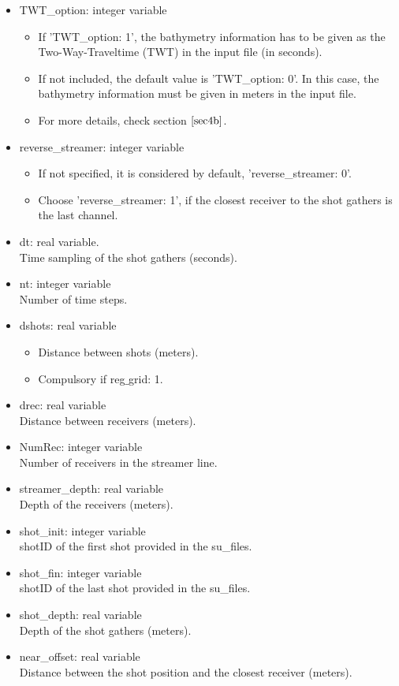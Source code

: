 \documentclass[11pt, oneside]{article}   	%
\begin{document}
\begin{itemize}
\begin{itemize}
	\end{itemize}
	
\item  TWT\_option: integer variable 
	\begin{itemize}
	\item If 'TWT\_option: 1', the bathymetry information has to be given as the Two-Way-Traveltime (TWT) in the input file (in seconds).
	\item If not included, the default value is 'TWT\_option: 0'. In this case, the bathymetry information must be given in meters in the input file.
	\item For more details, check section $\ref{sec4b}$.

	\end{itemize}
  
\item reverse\_streamer: integer variable 
	\begin{itemize}
	\item If not specified, it is considered by default, 'reverse\_streamer: 0'. 
	\item Choose 'reverse\_streamer: 1', if the closest receiver to the shot gathers is the last channel.
	\end{itemize}
  

\item dt: real variable. \\
Time sampling of the shot gathers (seconds).
\item nt: integer variable  \\
Number of time steps.
\item dshots: real variable
	\begin{itemize}
	\item Distance between shots (meters).
	\item Compulsory if reg$\_$grid: 1.
\end{itemize}
\item drec: real variable  \\
Distance between receivers (meters).
\item NumRec: integer variable  \\
Number of receivers in the streamer line.
\item streamer\_depth: real variable  \\ 
Depth of the receivers (meters).
\item shot\_init: integer variable  \\
shotID of the first shot provided in the su\_files.
\item shot\_fin: integer variable \\
shotID of the last shot provided in the su\_files.
\item shot\_depth: real variable  \\
Depth of the shot gathers (meters).
\item near\_offset: real variable  \\
Distance between the shot position and the closest receiver (meters).


\end{itemize}
\end{document}
